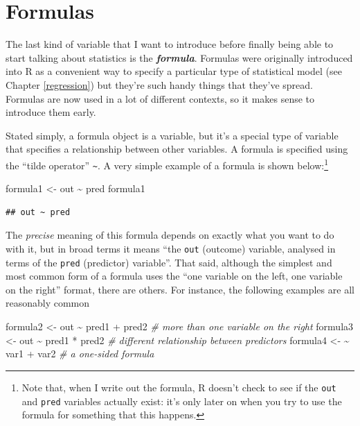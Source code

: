 \documentclass[
]{book}
\newenvironment{Shaded}{\begin{snugshade}}{\end{snugshade}}
\newcommand{\CommentTok}[1]{\textcolor[rgb]{0.56,0.35,0.01}{\textit{#1}}}
\newcommand{\ErrorTok}[1]{\textcolor[rgb]{0.64,0.00,0.00}{\textbf{#1}}}
\newcommand{\NormalTok}[1]{#1}
\newcommand{\OtherTok}[1]{\textcolor[rgb]{0.56,0.35,0.01}{#1}}
\newcommand{\SpecialCharTok}[1]{\textcolor[rgb]{0.00,0.00,0.00}{#1}}
\begin{document}
\hypertarget{formulas}{%
\section{Formulas}\label{formulas}}

The last kind of variable that I want to introduce before finally being able to start talking about statistics is the \textbf{\emph{formula}}. Formulas were originally introduced into R as a convenient way to specify a particular type of statistical model (see Chapter \ref{regression}) but they're such handy things that they've spread. Formulas are now used in a lot of different contexts, so it makes sense to introduce them early.

Stated simply, a formula object is a variable, but it's a special type of variable that specifies a relationship between other variables. A formula is specified using the ``tilde operator'' \texttt{\textasciitilde{}}. A very simple example of a formula is shown below:\footnote{Note that, when I write out the formula, R doesn't check to see if the \texttt{out} and \texttt{pred} variables actually exist: it's only later on when you try to use the formula for something that this happens.}

\begin{Shaded}
\begin{Highlighting}[]
\NormalTok{formula1 }\OtherTok{\textless{}{-}}\NormalTok{ out }\SpecialCharTok{\textasciitilde{}}\NormalTok{ pred}
\NormalTok{formula1}
\end{Highlighting}
\end{Shaded}

\begin{verbatim}
## out ~ pred
\end{verbatim}

The \emph{precise} meaning of this formula depends on exactly what you want to do with it, but in broad terms it means ``the \texttt{out} (outcome) variable, analysed in terms of the \texttt{pred} (predictor) variable''. That said, although the simplest and most common form of a formula uses the ``one variable on the left, one variable on the right'' format, there are others. For instance, the following examples are all reasonably common

\begin{Shaded}
\begin{Highlighting}[]
\NormalTok{formula2 }\OtherTok{\textless{}{-}}\NormalTok{  out }\SpecialCharTok{\textasciitilde{}}\NormalTok{ pred1 }\SpecialCharTok{+}\NormalTok{ pred2   }\CommentTok{\# more than one variable on the right}
\NormalTok{formula3 }\OtherTok{\textless{}{-}}\NormalTok{  out }\SpecialCharTok{\textasciitilde{}}\NormalTok{ pred1 }\SpecialCharTok{*}\NormalTok{ pred2   }\CommentTok{\# different relationship between predictors }
\NormalTok{formula4 }\OtherTok{\textless{}{-}}  \ErrorTok{\textasciitilde{}}\NormalTok{ var1 }\SpecialCharTok{+}\NormalTok{ var2         }\CommentTok{\# a \textquotesingle{}one{-}sided\textquotesingle{} formula}
\end{Highlighting}
\end{Shaded}
\end{document}
